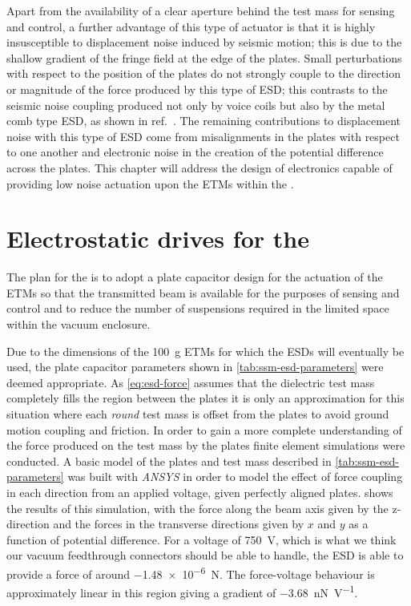 Apart from the availability of a clear aperture behind the test mass for sensing and control, a further advantage of this type of actuator is that it is highly insusceptible to displacement noise induced by seismic motion; this is due to the shallow gradient of the fringe field at the edge of the plates. Small perturbations with respect to the position of the plates do not strongly couple to the direction or magnitude of the force produced by this type of \gls{ESD}; this contrasts to the seismic noise coupling produced not only by voice coils but also by the metal comb type \gls{ESD}, as shown in ref.~\cite{Wittel2015}. The remaining contributions to displacement noise with this type of \gls{ESD} come from misalignments in the plates with respect to one another and electronic noise in the creation of the potential difference across the plates. This chapter will address the design of electronics capable of providing low noise actuation upon the \glspl{ETM} within the \SSMEXPT{}.

\section{Electrostatic drives for the \SSMEXPT{}}
The plan for the \SSMEXPT{} is to adopt a plate capacitor design for the actuation of the \glspl{ETM} so that the transmitted beam is available for the purposes of sensing and control and to reduce the number of suspensions required in the limited space within the vacuum enclosure.

Due to the dimensions of the \SI{100}{\gram} \glspl{ETM} for which the \glspl{ESD} will eventually be used, the plate capacitor parameters shown in \cref{tab:ssm-esd-parameters} were deemed appropriate. As \cref{eq:esd-force} assumes that the dielectric test mass completely fills the region between the plates it is only an approximation for this situation where each \emph{round} test mass is offset from the plates to avoid ground motion coupling and friction. In order to gain a more complete understanding of the force produced on the test mass by the plates finite element simulations were conducted. A basic model of the plates and test mass described in \cref{tab:ssm-esd-parameters} was built with \emph{ANSYS} in order to model the effect of force coupling in each direction from an applied voltage, given perfectly aligned plates.  shows the results of this simulation, with the force along the beam axis given by the z-direction and the forces in the transverse directions given by $x$ and $y$ as a function of potential difference. For a voltage of \SI{750}{\volt}, which is what we think our vacuum feedthrough connectors should be able to handle, the \gls{ESD} is able to provide a force of around \SI{-1.48e-6}{\newton}. The force-voltage behaviour is approximately linear in this region giving a gradient of \SI{-3.68}{\nano\newton\per\volt}.


